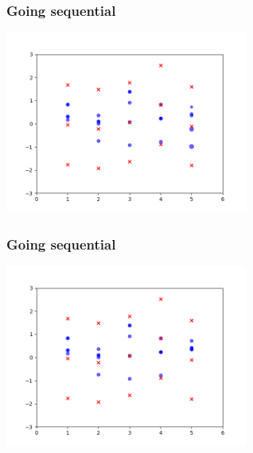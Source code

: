 \documentclass{beamer}
\begin{document}
\begin{frame}[fragile]
\frametitle{Going sequential}

\begin{center}
\includegraphics[width=80mm]{pfilt_anim_9.png}
\end{center}

\end{frame}
\begin{frame}[fragile]
\frametitle{Going sequential}

\begin{center}
\includegraphics[width=80mm]{pfilt_anim_10.png}
\end{center}

\end{frame}
\end{document}
